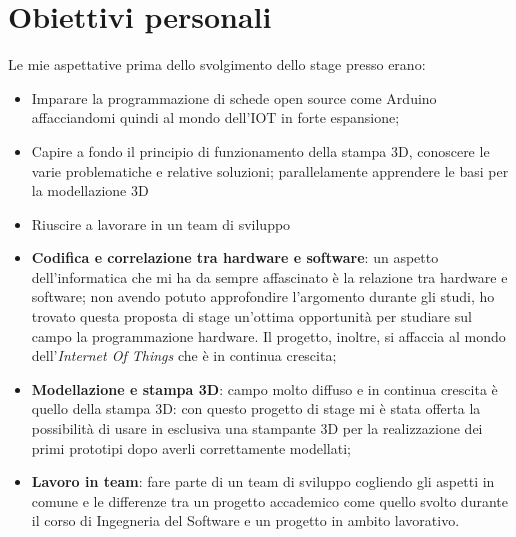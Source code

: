 \section{Obiettivi personali}
Le mie aspettative prima dello svolgimento dello stage presso \lab{} erano:
\begin{itemize}
\item Imparare la programmazione di schede open source come Arduino affacciandomi quindi al mondo dell'IOT in forte espansione;
\item Capire a fondo il principio di funzionamento della stampa 3D, conoscere le varie problematiche e relative soluzioni; parallelamente apprendere le basi per la modellazione 3D
\item Riuscire a lavorare in un team di sviluppo 
\end{itemize}

\begin{itemize}
\item \textbf{Codifica e correlazione tra hardware e software}: un aspetto dell'informatica che mi ha da sempre affascinato è la relazione tra hardware e software; non avendo potuto approfondire l'argomento durante gli studi, ho trovato questa proposta di stage un'ottima opportunità per studiare sul campo la programmazione hardware. Il progetto, inoltre, si affaccia al mondo dell'\textit{Internet Of Things} che è in continua crescita;
\item \textbf{Modellazione e stampa 3D}: campo molto diffuso e in continua crescita è quello della stampa 3D: con questo progetto di stage mi è stata offerta la possibilità di usare in esclusiva una stampante 3D per la realizzazione dei primi prototipi dopo averli correttamente modellati;
\item \textbf{Lavoro in team}: fare parte di un team di sviluppo cogliendo gli aspetti in comune e le differenze tra un progetto accademico come quello svolto durante il corso di Ingegneria del Software e un progetto in ambito lavorativo.
\end{itemize}


